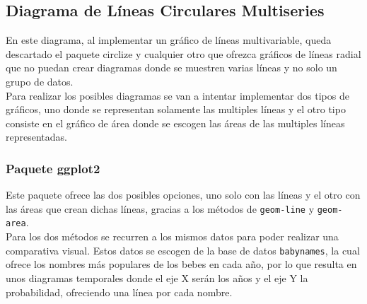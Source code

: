 \documentclass{article}\usepackage[]{graphicx}\usepackage[]{color}
\begin{document}
\subsection{Diagrama de L\'ineas Circulares Multiseries}\label{ssec:lineascircularmultiseries}
En este diagrama, al implementar un gr\'afico de l\'ineas multivariable, queda descartado el paquete circlize y cualquier otro que ofrezca gr\'aficos de l\'ineas radial que no puedan crear diagramas donde se muestren varias l\'ineas y no solo un grupo de datos.~\\
Para realizar los posibles diagramas se van a intentar implementar dos tipos de gr\'aficos, uno donde se representan solamente las multiples l\'ineas y el otro tipo consiste en el gr\'afico de \'area donde se escogen las \'areas de las multiples l\'ineas representadas.
\subsubsection{Paquete ggplot2}
Este paquete \cite{docu_ggplot2}
ofrece las dos posibles opciones, uno solo con las l\'ineas y el otro con las \'areas que crean dichas l\'ineas, gracias a los m\'etodos de \texttt{geom-line} y \texttt{geom-area}.~\\
Para los dos m\'etodos se recurren a los mismos datos para poder realizar una comparativa visual. Estos datos se escogen de la base de datos \texttt{babynames}, la cual ofrece los nombres m\'as populares de los bebes en cada a\~no, por lo que resulta en unos diagramas temporales donde el eje X ser\'an los a\~nos y el eje Y la probabilidad, ofreciendo una l\'inea por cada nombre.
\end{document}

